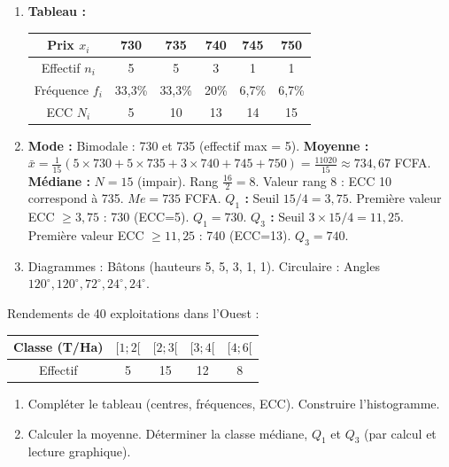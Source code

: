 \documentclass[11pt]{article}
\begin{document}
\begin{corrige}[Exercice 1]
\begin{enumerate}
    \item \textbf{Tableau :}
    \begin{center}
    \begin{tabular}{|c|ccccc|}\hline
    \rowcolor{popblueL} Prix $x_i$ & 730 & 735 & 740 & 745 & 750 \\ \hline
    Effectif $n_i$ & 5 & 5 & 3 & 1 & 1 \\ \hline
    Fréquence $f_i$ & 33,3\% & 33,3\% & 20\% & 6,7\% & 6,7\% \\ \hline
    ECC $N_i$ & 5 & 10 & 13 & 14 & 15 \\ \hline
    \end{tabular}
    \end{center}
    \item \textbf{Mode :} Bimodale : 730 et 735 (effectif max = 5).
    \textbf{Moyenne :} $\bar{x} = \frac{1}{15}(5\times730 + 5\times735 + 3\times740 + 745 + 750) = \frac{11020}{15} \approx 734,67$ FCFA.
    \textbf{Médiane :} $N=15$ (impair). Rang $\frac{16}{2}=8$. Valeur rang 8 : ECC 10 correspond à 735. $Me = 735$ FCFA.
    \textbf{$Q_1$ :} Seuil $15/4 = 3,75$. Première valeur ECC $\ge 3,75$ : 730 (ECC=5). $Q_1 = 730$.
    \textbf{$Q_3$ :} Seuil $3\times15/4 = 11,25$. Première valeur ECC $\ge 11,25$ : 740 (ECC=13). $Q_3 = 740$.
    \item Diagrammes : Bâtons (hauteurs 5, 5, 3, 1, 1). Circulaire : Angles $120^\circ, 120^\circ, 72^\circ, 24^\circ, 24^\circ$.
\end{enumerate}
\end{corrige}

\begin{exercice}
Rendements de 40 exploitations dans l'Ouest :
\begin{center}
\begin{tabular}{|c|cccc|}\hline
\rowcolor{popblueL} Classe (T/Ha) & $[1;2[$ & $[2;3[$ & $[3;4[$ & $[4;6[$ \\ \hline
Effectif & 5 & 15 & 12 & 8 \\ \hline
\end{tabular}
\end{center}
\begin{enumerate}
    \item Compléter le tableau (centres, fréquences, ECC). Construire l'histogramme.
    \item Calculer la moyenne. Déterminer la classe médiane, $Q_1$ et $Q_3$ (par calcul et lecture graphique).
\end{enumerate}
\end{exercice}
\end{document}
